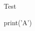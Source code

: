 \documentclass{beamer}
\begin{document}
\begin{frame}{Test}

\ifdefined\TestFrameNotFragile
\begin{python}
print('A')
\end{python}
\fi

\end{frame}
\end{document}
